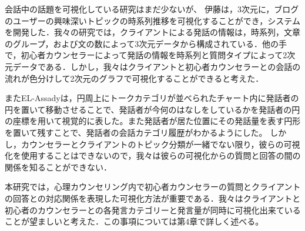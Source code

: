\documentclass[shuuron]{kuee}
\begin{document}
会話中の話題を可視化している研究はまだ少ないが、
  伊藤\cite{itoh2010interactive}は，3次元に，ブログのユーザーの興味深いトピックの時系列推移を可視化することができ，システムを開発した．我々の研究では，クライアントによる発話の情報は，時系列，文章のグループ，および文の数によって3次元データから構成されている．他の手で，初心者カウンセラーによって発話の情報を時系列と質問タイプによって2次元データである．しかし，我々はクライアントと初心者カウンセラーとの会話の流れが色分けして2次元のグラフで可視化することができると考えた．


     またEL-Assady\cite{el2016contovi}は，円周上にトークカテゴリが並べられたチャート内に発話者の円を置いて移動させることで、発話者が今何のはなしをしているかを発話者の円の座標を用いて視覚的に表した。また発話者が居た位置にその発話量を表す円形を置いて残すことで、発話者の会話カテゴリ履歴がわかるようにした。
  しかし，カウンセラーとクライアントのトピック分類が一緒でない限り，彼らの可視化を使用することはできないので，我々は彼らの可視化からの質問と回答の間の関係を知ることができない．


  本研究では，心理カウンセリング内で初心者カウンセラーの質問とクライアントの回答との対応関係を表現した可視化方法が重要である．我々はクライアントと初心者のカウンセラーとの各発言カテゴリーと発言量が同時に可視化出来ていることが望ましいと考えた．この事項については第4章で詳しく述べる。
\end{document}
